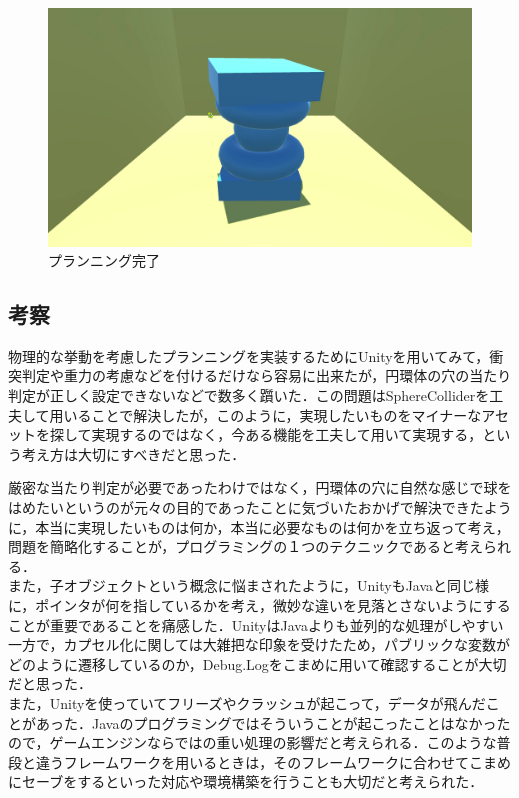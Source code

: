 \documentclass[uplatex,12pt]{jsarticle}
\begin{document}
\begin{figure}[!hbt]
  	\begin{center}
  		\includegraphics[scale=0.2]{images/bwp7.jpg}
	\end{center}
  	\caption{プランニング完了}
\end{figure}
\clearpage

\subsection{考察}
物理的な挙動を考慮したプランニングを実装するためにUnityを用いてみて，衝突判定や重力の考慮などを付けるだけなら容易に出来たが，円環体の穴の当たり判定が正しく設定できないなどで数多く躓いた．この問題はSphereColliderを工夫して用いることで解決したが，このように，実現したいものをマイナーなアセットを探して実現するのではなく，今ある機能を工夫して用いて実現する，という考え方は大切にすべきだと思った．

厳密な当たり判定が必要であったわけではなく，円環体の穴に自然な感じで球をはめたいというのが元々の目的であったことに気づいたおかげで解決できたように，本当に実現したいものは何か，本当に必要なものは何かを立ち返って考え，問題を簡略化することが，プログラミングの１つのテクニックであると考えられる． \\

また，子オブジェクトという概念に悩まされたように，UnityもJavaと同じ様に，ポインタが何を指しているかを考え，微妙な違いを見落とさないようにすることが重要であることを痛感した．UnityはJavaよりも並列的な処理がしやすい一方で，カプセル化に関しては大雑把な印象を受けたため，パブリックな変数がどのように遷移しているのか，Debug.Logをこまめに用いて確認することが大切だと思った． \\

また，Unityを使っていてフリーズやクラッシュが起こって，データが飛んだことがあった．Javaのプログラミングではそういうことが起こったことはなかったので，ゲームエンジンならではの重い処理の影響だと考えられる．このような普段と違うフレームワークを用いるときは，そのフレームワークに合わせてこまめにセーブをするといった対応や環境構築を行うことも大切だと考えられた． \\
\end{document}
